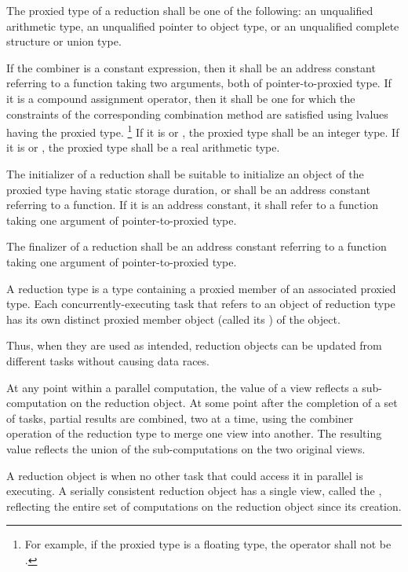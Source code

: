 \pnum
The proxied type of a reduction shall be
one of the following:
an unqualified arithmetic type,
an unqualified pointer to object type,
or an unqualified complete structure or union type.

\pnum
If the combiner is a constant expression,
then it shall be an address constant
referring to a function taking two arguments,
both of pointer-to-proxied type.
If it is a compound assignment operator,
then it shall be one
for which the constraints of the corresponding combination method
are satisfied using lvalues having the proxied type.%
\footnote{
For example, if the proxied type is a floating type,
the operator shall not be
\tcode{|=}.
}
If it is
or
,
the proxied type shall be an integer type.
If it is
or
,
the proxied type shall be a real arithmetic type.

\pnum
The initializer of a reduction
shall be suitable to initialize
an object of the proxied type
having static storage duration,
or shall be an address constant referring to a function.
If it is an address constant,
it shall refer to a function
taking one argument of pointer-to-proxied type.

\pnum
The finalizer of a reduction
shall be an address constant referring to a function
taking one argument of pointer-to-proxied type.


\pnum
A reduction type is a type containing a proxied member
of an associated proxied type.
Each concurrently-executing task
that refers to an object of reduction type
has its own distinct proxied member object
(called its
)
of the object.

\begin{note}
Thus, when they are used as intended,
reduction objects can be updated from different tasks
without causing data races.
\end{note}

\pnum
At any point within a parallel computation,
the value of a view reflects a sub-computation on the reduction object.
At some point after the completion of a set of tasks,
partial results are combined, two at a time,
using the combiner operation of the reduction type
to merge one view into another.
The resulting value reflects the union
of the sub-computations on the two original views.
 
\pnum
A reduction object is
when no other task that could access it in parallel is executing.
A serially consistent reduction object has a single view,
called the
,
reflecting the entire set of computations on the reduction object
since its creation.
 
